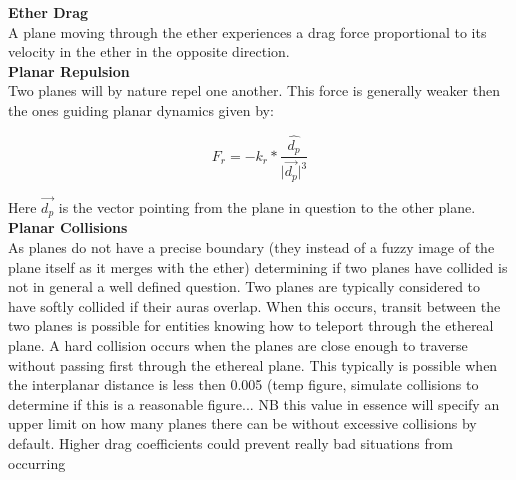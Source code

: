 \documentclass[10pt]{article}
\begin{document}
\noindent\textbf{Ether Drag}\\
A plane moving through the ether experiences a drag force proportional to its velocity in the ether in the opposite direction.\\

\noindent\textbf{Planar Repulsion}\\
Two planes will by nature repel one another. This force is generally weaker then the ones guiding planar dynamics given by:

\[
F_r = -k_r*\frac{\hat{d_p}}{\vert\overrightarrow{d_p}\vert^3}
\]

Here $\overrightarrow{d_p}$ is the vector pointing from the plane in question to the other plane.\\

\noindent\textbf{Planar Collisions}\\
As planes do not have a precise boundary (they instead of a fuzzy image of the plane itself as it merges with the ether) determining if two planes have collided is not in general a well defined question. Two planes are typically considered to have softly collided if their auras overlap. When this occurs, transit between the two planes is possible for entities knowing how to teleport through the ethereal plane. A hard collision occurs when the planes are close enough to traverse without passing first through the ethereal plane. This typically is possible when the interplanar distance is less then 0.005 (temp figure, simulate collisions to determine if this is a reasonable figure... NB this value in essence will specify an upper limit on how many planes there can be without excessive collisions by default. Higher drag coefficients could prevent really bad situations from occurring
\end{document}
